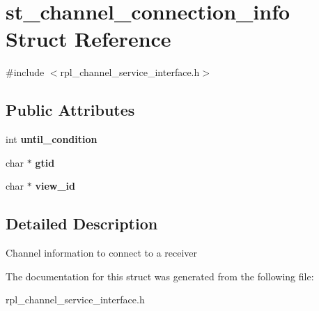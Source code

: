 \hypertarget{structst__channel__connection__info}{}\section{st\+\_\+channel\+\_\+connection\+\_\+info Struct Reference}
\label{structst__channel__connection__info}


{\ttfamily \#include $<$rpl\+\_\+channel\+\_\+service\+\_\+interface.\+h$>$}

\subsection*{Public Attributes}
\begin{DoxyCompactItemize}
\item 
\mbox{\label{structst__channel__connection__info_a401aee4d058bdb25a41cac2274b2d20a}} 
int {\bfseries until\+\_\+condition}
\item 
\mbox{\label{structst__channel__connection__info_a624d3549892780e6501249598f11a5fc}} 
char $\ast$ {\bfseries gtid}
\item 
\mbox{\label{structst__channel__connection__info_a034e3912232046a0293a5dbfcc3fe01a}} 
char $\ast$ {\bfseries view\+\_\+id}
\end{DoxyCompactItemize}


\subsection{Detailed Description}
Channel information to connect to a receiver 

The documentation for this struct was generated from the following file\+:\begin{DoxyCompactItemize}
\item 
rpl\+\_\+channel\+\_\+service\+\_\+interface.\+h\end{DoxyCompactItemize}

